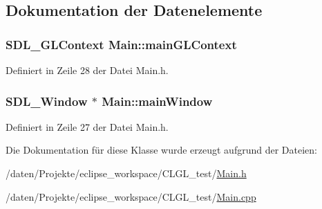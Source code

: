 \subsection{Dokumentation der Datenelemente}
\hypertarget{classMain_a984d2733994032c9087b63e328764672}{
\subsubsection[{main\-G\-L\-Context}]{\setlength{\rightskip}{0pt plus 5cm}S\-D\-L\-\_\-\-G\-L\-Context Main\-::main\-G\-L\-Context\hspace{0.3cm}{\ttfamily [private]}}}\label{classMain_a984d2733994032c9087b63e328764672}


Definiert in Zeile 28 der Datei Main.\-h.

\hypertarget{classMain_aa76a383cb4c4a9da5e4522dc3983fa6b}{
\subsubsection[{main\-Window}]{\setlength{\rightskip}{0pt plus 5cm}S\-D\-L\-\_\-\-Window $\ast$ Main\-::main\-Window\hspace{0.3cm}{\ttfamily [private]}}}\label{classMain_aa76a383cb4c4a9da5e4522dc3983fa6b}


Definiert in Zeile 27 der Datei Main.\-h.



Die Dokumentation für diese Klasse wurde erzeugt aufgrund der Dateien\-:\begin{DoxyCompactItemize}
\item 
/daten/\-Projekte/eclipse\-\_\-workspace/\-C\-L\-G\-L\-\_\-test/\hyperlink{CLGL__test_2Main_8h}{Main.\-h}\item 
/daten/\-Projekte/eclipse\-\_\-workspace/\-C\-L\-G\-L\-\_\-test/\hyperlink{CLGL__test_2Main_8cpp}{Main.\-cpp}\end{DoxyCompactItemize}

